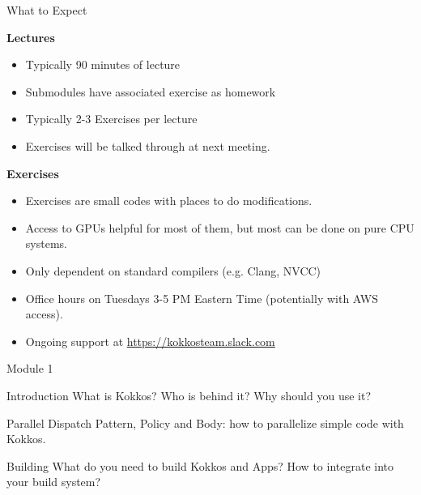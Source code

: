 \begin{frame}{What to Expect}

\textbf{Lectures}
\begin{itemize}
	\item Typically 90 minutes of lecture
	\item Submodules have associated exercise as homework
	\item Typically 2-3 Exercises per lecture
	\item Exercises will be talked through at next meeting.
\end{itemize}

	\vspace{10pt}

\textbf{Exercises}
\begin{itemize}
	\item Exercises are small codes with places to do modifications.
	\item Access to GPUs helpful for most of them, but most can be done on pure CPU systems.
	\item Only dependent on standard compilers (e.g. Clang, NVCC)
	\item Office hours on Tuesdays 3-5 PM Eastern Time (potentially with AWS access).
        \item Ongoing support at \url{https://kokkosteam.slack.com}
\end{itemize}
\end{frame}

\begin{frame}{Module 1}
  \begin{block}{Introduction}
    What is Kokkos? Who is behind it? Why should you use it?
  \end{block}

  \begin{block}{Parallel Dispatch}
    Pattern, Policy and Body: how to parallelize simple code with Kokkos.
  \end{block}

  \begin{block}{Building}
    What do you need to build Kokkos and Apps? How to integrate into your build system?
  \end{block}

\end{frame}
